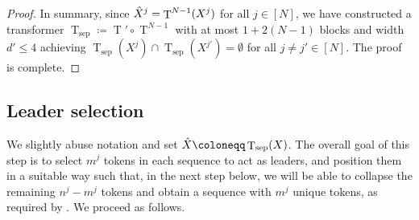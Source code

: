 \documentclass[pdflatex,sn-mathphys-num]{sn-jnl}%
\theoremstyle{thmstyleone}%
\theoremstyle{thmstyletwo}%
\theoremstyle{thmstylethree}%
\numberwithin{equation}{section}
\DeclareMathOperator{\T}{\mathrm{T}}
\begin{document}
\begin{proof}
In summary, since $\Hat{X}^j = \T^{N-1}(X^j)$ for all $j\in[N]$, we have constructed a transformer $\T_\text{sep} \coloneqq \T' \circ \T^{N-1}$ with at most $1 + 2(N-1)$ blocks and width $d'\leq 4$ achieving $\T_\text{sep}({X}^j) \cap \T_\text{sep}({X}^{j'}) = \emptyset$ for all $j\neq j'\in [N]$. The proof is complete.
\end{proof}

\subsection{Leader selection}\label{ss:leaderSelectionStep}

We slightly abuse notation and set $\Hat{X} \coloneqq \T_{\text{sep}}(X)$. The overall goal of this step is to select $m^j$ tokens in each sequence to act as leaders, and position them in a suitable way such that, in the next step below, we will be able to collapse the remaining $n^j - m^j$ tokens and obtain a sequence with $m^j$ unique tokens, as required by  . We proceed as follows.
\end{document}
